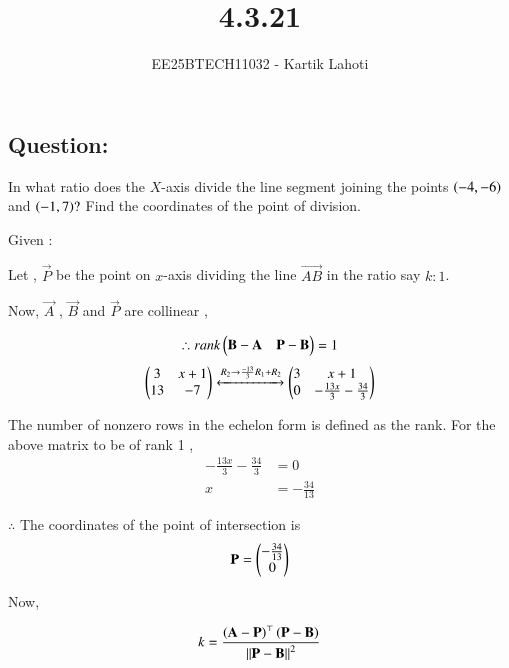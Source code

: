 \documentclass[journal]{IEEEtran}
\numberwithin{equation}{enumi}
\numberwithin{figure}{enumi}
\begin{document}

\vspace{3cm}

\title{4.3.21}
\author{EE25BTECH11032 - Kartik Lahoti}
\maketitle

\subsection*{Question: } 
In what ratio does the $X$-axis divide the line segment joining the points $\left(-4,-6\right)$ and $\left(-1,7\right)?$ Find the coordinates of the point of division.

\solution 

Given : 
\begin{table}[H]
    \centering
    
    \caption*{}
    \label{tab:placeholder_1}
\end{table}

Let , $\vec{P}$ be the point on $x$-axis dividing the  line $\vec{AB}$ in the ratio say $k\colon1$.

Now, $\vec{A}$ , $\vec{B}$ and $\vec{P}$ are collinear , 

\begin{align}
    \therefore rank\begin{pmatrix}\mathbf{B} - \mathbf{A} & \mathbf{P} - \mathbf{B}\end{pmatrix} = 1
\end{align}
\begin{align}
    \begin{pmatrix}3 & x+1 \\ 13 & -7 \end{pmatrix} \xleftrightarrow[]{R_2 \rightarrow {\frac{-13}{3}R_1 + R_2}} \begin{pmatrix}3 & x+1 \\ 0 & -\frac{13x}{3}-\frac{34}{3} \end{pmatrix} 
\end{align}

The number of nonzero rows in the echelon form is defined as the rank. For the above matrix to be of rank 1 ,
\begin{align}
    -\frac{13x}{3}-\frac{34}{3} &= 0  \\ 
    x &= -\frac{34}{13}
\end{align}

$\therefore$ The coordinates of the point of intersection is 
\begin{align}
    \mathbf{P} = \begin{pmatrix}-\frac{34}{13}  \\ 0\end{pmatrix}
\end{align}

Now, 

\begin{align}
    k = \frac{\left(\mathbf{A} - \mathbf{P}\right)^{\top}\left(\mathbf{P} - \mathbf{B}\right)}{\left\lVert\mathbf{P} - \mathbf{B}\right\rVert^2}
\end{align}
\end{document}
